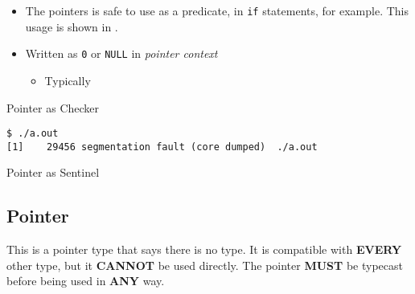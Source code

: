 \begin{itemize}[noitemsep]
\item The  pointers is safe to use as a predicate, in \texttt{if} statements, for example.
  This usage is shown in .
\item Written as \texttt{0} or \texttt{NULL} in \emph{pointer context}
  \begin{itemize}
  \item Typically 
  \end{itemize}
\end{itemize}

\begin{listing}[h!tbp]
\caption{\texorpdfstring{}{\texttt{NULL}} Pointer as Checker}
\label{lst:NULL_Pointer-Checker}

\begin{verbatim}
$ ./a.out
[1]    29456 segmentation fault (core dumped)  ./a.out
\end{verbatim}
\end{listing}

\begin{listing}[h!tbp]
\caption{\texorpdfstring{}{\texttt{NULL}} Pointer as Sentinel}
\label{lst:NULL_Pointer-Sentinel}
\end{listing}

\subsection{\texorpdfstring{}{\texttt{void}} Pointer}\label{subsec:void_Pointer}
This is a pointer type that says there is no type.
It is compatible with \textbf{EVERY} other  type, but it \textbf{CANNOT} be used directly.
The  pointer \textbf{MUST} be typecast before being used in \textbf{ANY} way.

